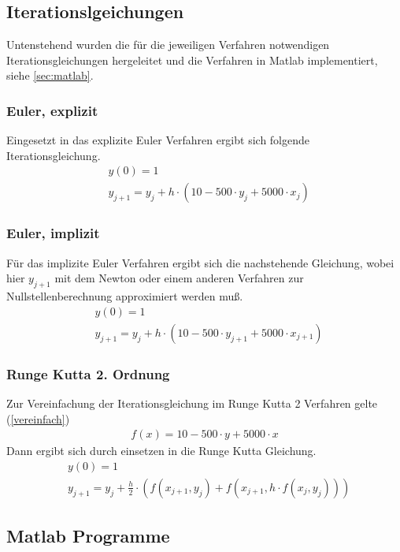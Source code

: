 \documentclass[10pt]{scrartcl}
\begin{document}
	\subsection{Iterationslgeichungen}	
	Untenstehend wurden die für die jeweiligen Verfahren notwendigen Iterationsgleichungen hergeleitet und die Verfahren in Matlab implementiert, siehe \ref{sec:matlab}.
	\subsubsection{Euler, explizit}
	Eingesetzt in das explizite Euler Verfahren ergibt sich folgende Iterationsgleichung.
	\begin{align}
		&y(0)=1\\
		&y_{j+1}=y_{j} + h \cdot (10-500 \cdot y_{j} + 5000 \cdot x_j)
	\end{align}
	
	\subsubsection{Euler, implizit}
	Für das implizite Euler Verfahren ergibt sich die nachstehende Gleichung, wobei hier $y_{j+1}$ mit dem Newton oder einem anderen Verfahren zur Nullstellenberechnung approximiert werden muß.
	\begin{align}
		&y(0)=1\\
		&y_{j+1}=y_{j} + h \cdot (10-500 \cdot y_{j+1} + 5000 \cdot x_{j+1})
	\end{align}
	
	
	\subsubsection{Runge Kutta 2. Ordnung}
	Zur Vereinfachung der Iterationsgleichung im Runge Kutta 2 Verfahren gelte  (\ref{vereinfach})
	\begin{align}	
	 f(x) = 10-500 \cdot y + 5000 \cdot x \label{vereinfach} 
	\end{align}
	Dann ergibt sich durch einsetzen in die Runge Kutta Gleichung.
	\begin{align}
		&y(0)=1\\
		&y_{j+1}=y_{j} + \frac{h}{2} \cdot (f(x_{j+1}, y_{j}) + f(x_{j+1}, h \cdot f(x_j, y_j)) )
	\end{align}

\subsection{Matlab Programme}
	
	
\end{document}
